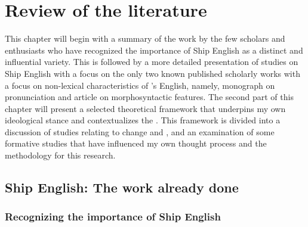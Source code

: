 \chapter{{Review of the literature}}

This chapter will begin with a summary of the work by the few scholars and enthusiasts who have recognized the importance of Ship English as a distinct and influential variety. This is followed by a more detailed presentation of studies on Ship English with a focus on the only two known published scholarly works with a focus on non-lexical characteristics of  ’s English, namely,  monograph on pronunciation and  article on morphosyntactic features. The second part of this chapter will present a selected theoretical framework that underpins my own ideological stance and contextualizes the . This framework is divided into a discussion of studies relating to  change and , and an examination of some formative studies that have influenced my own thought process and the methodology for this research. 

\section{{Ship English: The work already done}}\label{sec:2.1}

\subsection{{Recognizing the importance of Ship English}}\label{sec:2.1.1}

